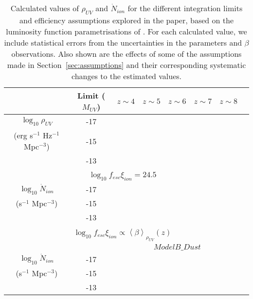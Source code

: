 \begin{table*}\label{tab:bouwens_N}
  \caption{Calculated values of $\rho_{UV}$ and $\dot{N}_{ion}$ for the different integration limits and efficiency assumptions explored in the paper, based on the luminosity function parametrisations of \citet{Bouwens:2014tx}. For each calculated value, we include statistical errors from the uncertainties in the \citet{Schechter:1976gl} parameters and $\beta$ observations. Also shown are the effects of some of the assumptions made in Section~\ref{sec:assumptions} and their corresponding systematic changes to the estimated values.}
  \begin{tabular}{cc|cccccc}
  \hline
   & Limit ($M_{UV}$) & $z\sim4$ & $z\sim5$ & $z\sim6$ & $z\sim7$ & $z\sim8$ & \\
   \hline
  $\log_{10} \rho_{UV}$ 							& -17 &  \\
   (erg s$^{-1}$ Hz$^{-1}$ Mpc$^{-3}$)	& -15 &  \\
																& -13 &  \\

	 \multicolumn{7}{c}{}\\
	 \multicolumn{7}{c}{$\log_{10}f_{esc}\xi_{ion} = 24.5$}\\\hline
$\log_{10} \dot{N}_{ion}$	 		& -17 &  \\
(s$^{-1}$ Mpc$^{-3}$) 				& -15 &  \\
												& -13 &  \\
												
	 \multicolumn{7}{c}{}\\
	 \multicolumn{7}{c}{$\log_{10}f_{esc}\xi_{ion} \propto \left \langle \beta  \right \rangle_{\rho_{UV}}(z)$}\\ \hline
	
	  & & \multicolumn{5}{c}{$ModelB\_Dust$}\\
	  
$\log_{10} \dot{N}_{ion}$	 		& -17 &  \\
(s$^{-1}$ Mpc$^{-3}$) 				& -15 &  \\
												& -13 &  \\
												

\end{tabular}
\end{table*}
